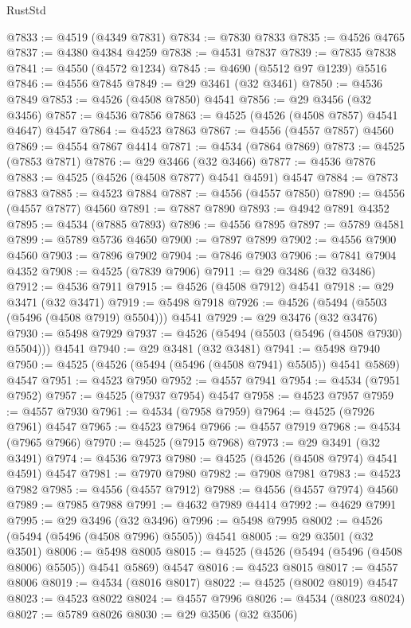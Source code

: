 \begin{lexlean}{RustStd}
\begin{coremodule}
{\begin{coremodule}
{{{{{{{{{{{{{{{{{{{{{{{{{{{{{{{{{{{{{{{{{{{{{{{{{{{{{{{@7833 := @4519 (@4349 @7831)
@7834 := @7830 @7833
@7835 := @4526 @4765
@7837 := @4380 @4384 @4259
@7838 := @4531 @7837
@7839 := @7835 @7838
@7841 := @4550 (@4572 @1234)
@7845 := @4690 (@5512 @97 @1239) @5516
@7846 := @4556 @7845
@7849 := @29 @3461 (@32 @3461)
@7850 := @4536 @7849
@7853 := @4526 (@4508 @7850) @4541
@7856 := @29 @3456 (@32 @3456)
@7857 := @4536 @7856
@7863 := @4525 (@4526 (@4508 @7857) @4541 @4647) @4547
@7864 := @4523 @7863
@7867 := @4556 (@4557 @7857) @4560
@7869 := @4554 @7867 @4414
@7871 := @4534 (@7864 @7869)
@7873 := @4525 (@7853 @7871)
@7876 := @29 @3466 (@32 @3466)
@7877 := @4536 @7876
@7883 := @4525 (@4526 (@4508 @7877) @4541 @4591) @4547
@7884 := @7873 @7883
@7885 := @4523 @7884
@7887 := @4556 (@4557 @7850)
@7890 := @4556 (@4557 @7877) @4560
@7891 := @7887 @7890
@7893 := @4942 @7891 @4352
@7895 := @4534 (@7885 @7893)
@7896 := @4556 @7895
@7897 := @5789 @4581
@7899 := @5789 @5736 @4650
@7900 := @7897 @7899
@7902 := @4556 @7900 @4560
@7903 := @7896 @7902
@7904 := @7846 @7903
@7906 := @7841 @7904 @4352
@7908 := @4525 (@7839 @7906)
@7911 := @29 @3486 (@32 @3486)
@7912 := @4536 @7911
@7915 := @4526 (@4508 @7912) @4541
@7918 := @29 @3471 (@32 @3471)
@7919 := @5498 @7918
@7926 := @4526 (@5494 (@5503 (@5496 (@4508 @7919) @5504))) @4541
@7929 := @29 @3476 (@32 @3476)
@7930 := @5498 @7929
@7937 := @4526 (@5494 (@5503 (@5496 (@4508 @7930) @5504))) @4541
@7940 := @29 @3481 (@32 @3481)
@7941 := @5498 @7940
@7950 := @4525 (@4526 (@5494 (@5496 (@4508 @7941) @5505)) @4541 @5869) @4547
@7951 := @4523 @7950
@7952 := @4557 @7941
@7954 := @4534 (@7951 @7952)
@7957 := @4525 (@7937 @7954) @4547
@7958 := @4523 @7957
@7959 := @4557 @7930
@7961 := @4534 (@7958 @7959)
@7964 := @4525 (@7926 @7961) @4547
@7965 := @4523 @7964
@7966 := @4557 @7919
@7968 := @4534 (@7965 @7966)
@7970 := @4525 (@7915 @7968)
@7973 := @29 @3491 (@32 @3491)
@7974 := @4536 @7973
@7980 := @4525 (@4526 (@4508 @7974) @4541 @4591) @4547
@7981 := @7970 @7980
@7982 := @7908 @7981
@7983 := @4523 @7982
@7985 := @4556 (@4557 @7912)
@7988 := @4556 (@4557 @7974) @4560
@7989 := @7985 @7988
@7991 := @4632 @7989 @4414
@7992 := @4629 @7991
@7995 := @29 @3496 (@32 @3496)
@7996 := @5498 @7995
@8002 := @4526 (@5494 (@5496 (@4508 @7996) @5505)) @4541
@8005 := @29 @3501 (@32 @3501)
@8006 := @5498 @8005
@8015 := @4525 (@4526 (@5494 (@5496 (@4508 @8006) @5505)) @4541 @5869) @4547
@8016 := @4523 @8015
@8017 := @4557 @8006
@8019 := @4534 (@8016 @8017)
@8022 := @4525 (@8002 @8019) @4547
@8023 := @4523 @8022
@8024 := @4557 @7996
@8026 := @4534 (@8023 @8024)
@8027 := @5789 @8026
@8030 := @29 @3506 (@32 @3506)
}}}}}}}}}}}}}}}}}}}}}}}}}}}}}}}}}}}}}}}}}}}}}}}}}}}}}}}
\end{coremodule}}
\end{coremodule}
\end{lexlean}
